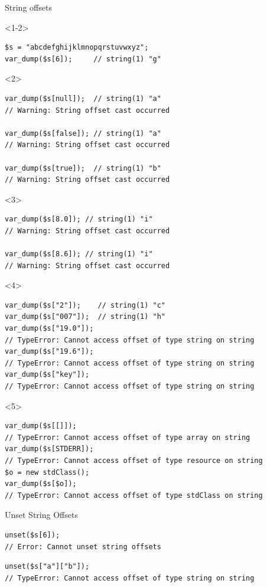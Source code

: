 \documentclass[aspectratio=169]{beamer}
\begin{document}
\begin{frame}[fragile]{String offsets}
    \begin{onlyenv}<1-2>
        \begin{verbatim}
$s = "abcdefghijklmnopqrstuvwxyz";
var_dump($s[6]);     // string(1) "g"
        \end{verbatim}
        \vfill
    \end{onlyenv}
    \begin{onlyenv}<2>
        \begin{verbatim}
var_dump($s[null]);  // string(1) "a"
// Warning: String offset cast occurred

var_dump($s[false]); // string(1) "a"
// Warning: String offset cast occurred

var_dump($s[true]);  // string(1) "b"
// Warning: String offset cast occurred
        \end{verbatim}
    \end{onlyenv}
    \begin{onlyenv}<3>
        \begin{verbatim}
var_dump($s[8.0]); // string(1) "i"
// Warning: String offset cast occurred

var_dump($s[8.6]); // string(1) "i"
// Warning: String offset cast occurred
        \end{verbatim}
    \end{onlyenv}
    \begin{onlyenv}<4>
        \begin{verbatim}
var_dump($s["2"]);    // string(1) "c"
var_dump($s["007"]);  // string(1) "h"
var_dump($s["19.0"]);
// TypeError: Cannot access offset of type string on string
var_dump($s["19.6"]);
// TypeError: Cannot access offset of type string on string
var_dump($s["key"]);
// TypeError: Cannot access offset of type string on string
        \end{verbatim}
    \end{onlyenv}
    \begin{onlyenv}<5>
        \begin{verbatim}
var_dump($s[[]]);
// TypeError: Cannot access offset of type array on string
var_dump($s[STDERR]);
// TypeError: Cannot access offset of type resource on string
$o = new stdClass();
var_dump($s[$o]);
// TypeError: Cannot access offset of type stdClass on string
        \end{verbatim}
    \end{onlyenv}
\end{frame}
\begin{frame}[fragile]{Unset String Offsets}
    \begin{verbatim}
unset($s[6]);
// Error: Cannot unset string offsets
    \end{verbatim}
    \pause
    \begin{verbatim}
unset($s["a"]["b"]);
// TypeError: Cannot access offset of type string on string
    \end{verbatim}
\end{frame}
\end{document}
